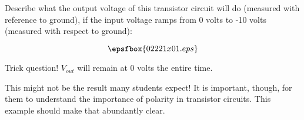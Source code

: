 

Describe what the output voltage of this transistor circuit will do (measured with reference to ground), if the input voltage ramps from 0 volts to -10 volts (measured with respect to ground):

$$\epsfbox{02221x01.eps}$$







Trick question!  $V_{out}$ will remain at 0 volts the entire time.







This might not be the result many students expect!  It is important, though, for them to understand the importance of polarity in transistor circuits.  This example should make that abundantly clear.




